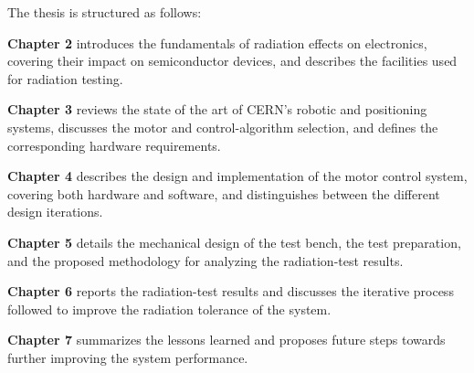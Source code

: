 The thesis is structured as follows:

\textbf{Chapter 2} introduces the fundamentals of radiation effects on electronics, covering their impact on semiconductor devices, and describes the facilities used for radiation testing.

\textbf{Chapter 3} reviews the state of the art of CERN's robotic and positioning systems, discusses the motor and control-algorithm selection, and defines the corresponding hardware requirements.

\textbf{Chapter 4} describes the design and implementation of the motor control system, covering both hardware and software, and distinguishes between the different design iterations.

\textbf{Chapter 5} details the mechanical design of the test bench, the test preparation, and the proposed methodology for analyzing the radiation-test results.

\textbf{Chapter 6} reports the radiation-test results and discusses the iterative process followed to improve the radiation tolerance of the system.

\textbf{Chapter 7} summarizes the lessons learned and proposes future steps towards further improving the system performance.